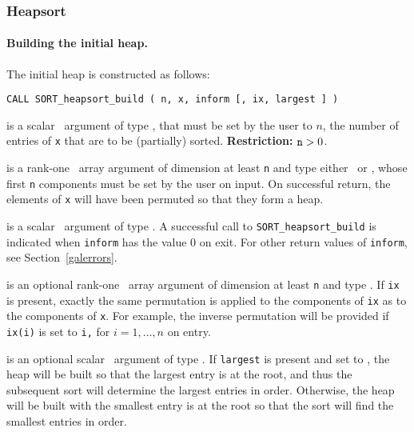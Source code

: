 \documentclass{galahad}
\newcommand{\packagename}{SORT}
\begin{document}

\subsubsection{Heapsort}

\paragraph{Building the initial heap.}
The initial heap is constructed as follows:
\vspace*{1mm}

\hspace{8mm}
{\tt CALL \packagename\_heapsort\_build ( n, x, inform [, ix, largest ] )}

\vspace*{-3mm}
\begin{description}
 is a scalar \intentin\ argument of type
\integer, that must be set by the user to $n$, the
number of entries of {\tt x} that are to be (partially) sorted.
{\bf Restriction:} ${\tt n} > 0$.

 is a rank-one \intentinout\ array argument of
dimension at least {\tt n} and type either
\integer\ or \realdp, whose first {\tt n} components  must be set by
the user on input. On successful return, the elements of {\tt x} will have
been permuted so that they form a heap.

 is a scalar \intentout\ argument of type \integer.
A successful call to {\tt \packagename\_heapsort\_build}
is indicated when {\tt inform} has the value 0 on exit.
For other return values of {\tt inform}, see Section~\ref{galerrors}.

 is an optional rank-one \intentinout\ array argument of
dimension at least {\tt n} and type \integer.
If {\tt ix} is present, exactly the same permutation is applied to the
components of {\tt ix} as to the components of {\tt x}.
For example, the inverse permutation will be
provided if {\tt ix(i)} is set to {\tt i,} for $i = 1, \ldots, n$
on entry.

 is an optional scalar \intentin\ argument
of type \integer.
If {\tt largest} is present and set to \true, the heap will be built so
that the largest entry is at the root, and thus the subsequent sort will
determine the largest entries in order. Otherwise, the heap will be
built with the smallest entry is at the root so that the sort will
find the smallest entries in order.
\end{description}
\end{document}
